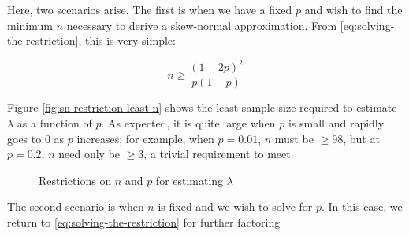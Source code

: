 \documentclass{article}
\begin{document}
Here, two scenarios arise. The first is when we have a fixed $p$ and wish to
find the minimum $n$ necessary to derive a skew-normal approximation. From
\eqref{eq:solving-the-restriction}, this is very simple:

\begin{equation}
  n \geq \frac{(1-2p)^2}{p(1-p)} \label{eq: n for a given p}
\end{equation}

Figure \ref{fig:sn-restriction-least-n} shows the least sample size required to
estimate $\lambda$ as a function of $p$. As expected, it is quite large when
$p$ is small and rapidly goes to 0 as $p$ increases; for example, when $p =
0.01$, $n$ must be $\geq 98$, but at $p = 0.2$, $n$ need only be $\geq 3$, a
trivial requirement to meet.

\begin{figure}
  \centering
  \quad
  \caption{Restrictions on $n$ and $p$ for estimating $\lambda$}
  \label{fig:sn-restriction}
\end{figure}

The second scenario is when $n$ is fixed and we wish to solve for $p$. In this
case, we return to \eqref{eq:solving-the-restriction} for further factoring
\end{document}
